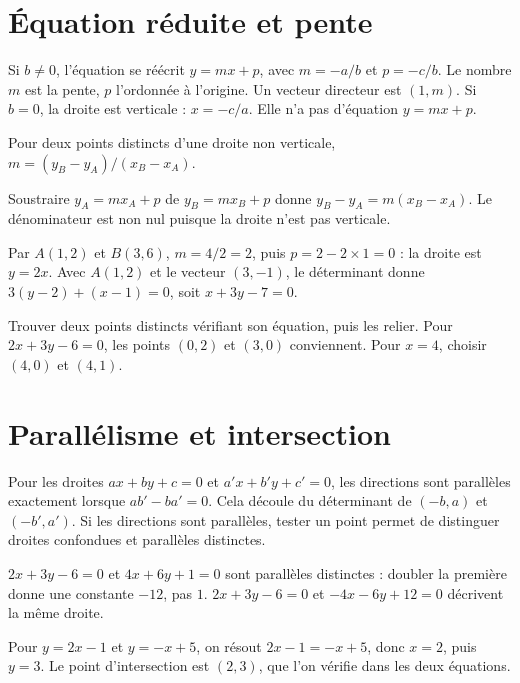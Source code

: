 \documentclass[../cours_2de.tex]{subfiles}
\begin{document}
\section{Équation réduite et pente}
Si $b\ne0$, l'équation se réécrit $y=mx+p$, avec $m=-a/b$ et $p=-c/b$.
Le nombre $m$ est la pente, $p$ l'ordonnée à l'origine. Un vecteur directeur est $(1,m)$.
Si $b=0$, la droite est verticale : $x=-c/a$. Elle n'a pas d'équation $y=mx+p$.
\begin{propriete}
Pour deux points distincts d'une droite non verticale,
$m=(y_B-y_A)/(x_B-x_A)$.
\end{propriete}
\begin{demonstration}
Soustraire $y_A=mx_A+p$ de $y_B=mx_B+p$ donne
$y_B-y_A=m(x_B-x_A)$. Le dénominateur est non nul puisque la droite n'est pas verticale.
\end{demonstration}
\begin{exemple}
Par $A(1,2)$ et $B(3,6)$, $m=4/2=2$, puis $p=2-2\times1=0$ : la droite est $y=2x$.
Avec $A(1,2)$ et le vecteur $(3,-1)$, le déterminant donne
$3(y-2)+(x-1)=0$, soit $x+3y-7=0$.
\end{exemple}
\begin{methode}
Trouver deux points distincts vérifiant son équation, puis les relier.
Pour $2x+3y-6=0$, les points $(0,2)$ et $(3,0)$ conviennent.
Pour $x=4$, choisir $(4,0)$ et $(4,1)$.
\end{methode}
\section{Parallélisme et intersection}
Pour les droites $ax+by+c=0$ et $a'x+b'y+c'=0$,
les directions sont parallèles exactement lorsque $ab'-ba'=0$.
Cela découle du déterminant de $(-b,a)$ et $(-b',a')$.
Si les directions sont parallèles, tester un point permet de distinguer droites confondues et parallèles distinctes.
\begin{exemple}
$2x+3y-6=0$ et $4x+6y+1=0$ sont parallèles distinctes : doubler la première donne une constante $-12$, pas $1$.
$2x+3y-6=0$ et $-4x-6y+12=0$ décrivent la même droite.
\end{exemple}
\begin{exemple}
Pour $y=2x-1$ et $y=-x+5$, on résout
$2x-1=-x+5$, donc $x=2$, puis $y=3$.
Le point d'intersection est $(2,3)$, que l'on vérifie dans les deux équations.
\end{exemple}
\end{document}
